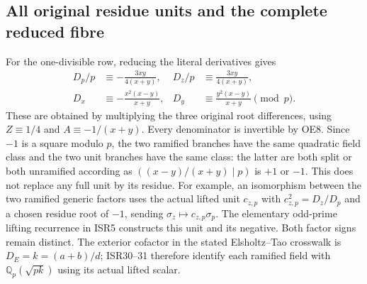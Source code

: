 \documentclass[11pt]{article}
\begin{document}
\subsection{All original residue units and the complete reduced fibre}
For the one-divisible row, reducing the literal derivatives gives
\begin{equation}
 \begin{aligned}
 D_p/p&\equiv-\frac{3xy}{4(x+y)},&
 D_z/p&\equiv\frac{3xy}{4(x+y)},\\
 D_x&\equiv-\frac{x^2(x-y)}{x+y},&
 D_y&\equiv\frac{y^2(x-y)}{x+y}\pmod p.
 \end{aligned}                                          \tag{OE14}
\end{equation}
These are obtained by multiplying the three original root
differences, using $Z\equiv1/4$ and $A\equiv-1/(x+y)$.
Every denominator is invertible by OE8. Since $-1$ is a square
modulo $p$, the two ramified branches have the same quadratic
field class and the two unit branches have the same class:
the latter are both split or both unramified according as
$((x-y)/(x+y)\mid p)$ is $+1$ or $-1$.
This does not replace any full unit by its residue. For example,
an isomorphism between the two ramified generic factors uses the
actual lifted unit $c_{z,p}$ with $c_{z,p}^2=D_z/D_p$ and a chosen
residue root of $-1$, sending $\sigma_z\mapsto c_{z,p}\sigma_p$.
The elementary odd-prime lifting recurrence in ISR5 constructs
this unit and its negative. Both factor signs remain distinct.
The exterior cofactor in the stated Elsholtz--Tao crosswalk is
$D_E=k=(a+b)/d$; ISR30--31 therefore identify each ramified field
with $\mathbb Q_p(\sqrt{pk})$ using its actual lifted scalar.
\end{document}
